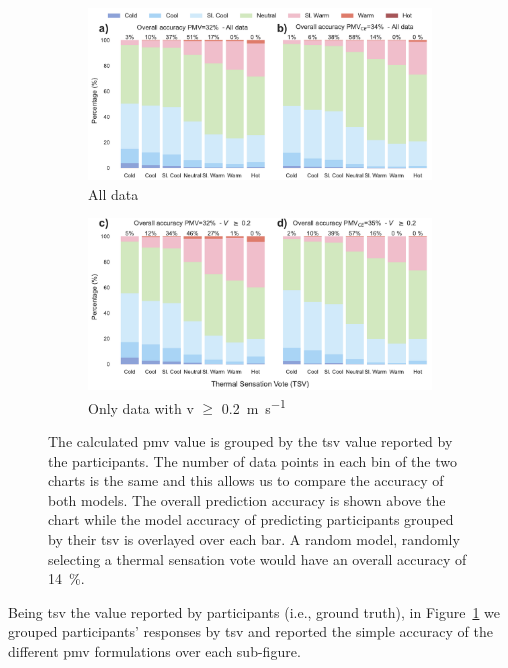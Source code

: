 \begin{figure}[htb!]
    \centering
    \begin{subfigure}[b]{\textwidth}
        \centering
        \includegraphics[width=\textwidth]{figures/bar_stacked_model_accuracy_0}
        \caption{All data}
     \end{subfigure}
    \begin{subfigure}[b]{\textwidth}
        \centering
        \includegraphics[width=\textwidth]{figures/bar_stacked_model_accuracy_0.2}
        \caption{Only data with \ac{v} $\geq$ \qty{0.2}{\m\per\s}}
     \end{subfigure}
    \caption{The calculated \ac{pmv} value is grouped by the \ac{tsv} value reported by the participants. 
    The number of data points in each bin of the two charts is the same and this allows us to compare the accuracy of both models.
    The overall prediction accuracy is shown above the chart while the model accuracy of predicting participants grouped by their \ac{tsv} is overlayed over each bar. 
    A random model, randomly selecting a thermal sensation vote would have an overall accuracy of \qty{14}{\percent}.}
    \label{fig:bar_stacked_model_accuracy}
\end{figure}
Being \ac{tsv} the value reported by participants (i.e., ground truth), in Figure~\ref{fig:bar_stacked_model_accuracy} we grouped participants' responses by \ac{tsv} and reported the simple accuracy of the different \ac{pmv} formulations over each sub-figure.
